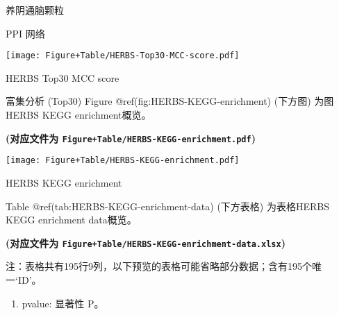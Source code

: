 \documentclass[
  ignorenonframetext,
]{beamer}
\providecommand{\tightlist}{%
  \setlength{\itemsep}{0pt}\setlength{\parskip}{0pt}}
\begin{document}
\begin{frame}[fragile]{养阴通脑颗粒}
\begin{block}{PPI 网络}
\def\@captype{figure}
\begin{center}
\texttt{[image: Figure+Table/HERBS-Top30-MCC-score.pdf]}
\caption{HERBS Top30 MCC score}\label{fig:HERBS-Top30-MCC-score}
\end{center}
\end{block}

\begin{block}{富集分析 (Top30)}
\protect\hypertarget{ux5bccux96c6ux5206ux6790-top30}{}
Figure @ref(fig:HERBS-KEGG-enrichment) (下方图) 为图HERBS KEGG
enrichment概览。

\textbf{(对应文件为 \texttt{Figure+Table/HERBS-KEGG-enrichment.pdf})}

\def\@captype{figure}
\begin{center}
\texttt{[image: Figure+Table/HERBS-KEGG-enrichment.pdf]}
\caption{HERBS KEGG enrichment}\label{fig:HERBS-KEGG-enrichment}
\end{center}

Table @ref(tab:HERBS-KEGG-enrichment-data) (下方表格) 为表格HERBS KEGG
enrichment data概览。

\textbf{(对应文件为
\texttt{Figure+Table/HERBS-KEGG-enrichment-data.xlsx})}

\begin{center}\begin{tcolorbox}[colback=gray!10, colframe=gray!50, width=0.9\linewidth, arc=1mm, boxrule=0.5pt]注：表格共有195行9列，以下预览的表格可能省略部分数据；含有195个唯一`ID'。
\end{tcolorbox}
\end{center}
\begin{center}\begin{tcolorbox}[colback=gray!10, colframe=gray!50, width=0.9\linewidth, arc=1mm, boxrule=0.5pt]\begin{enumerate}\tightlist
\item pvalue:  显著性 P。
\end{enumerate}\end{tcolorbox}
\end{center}


\end{block}
\end{frame}
\end{document}

